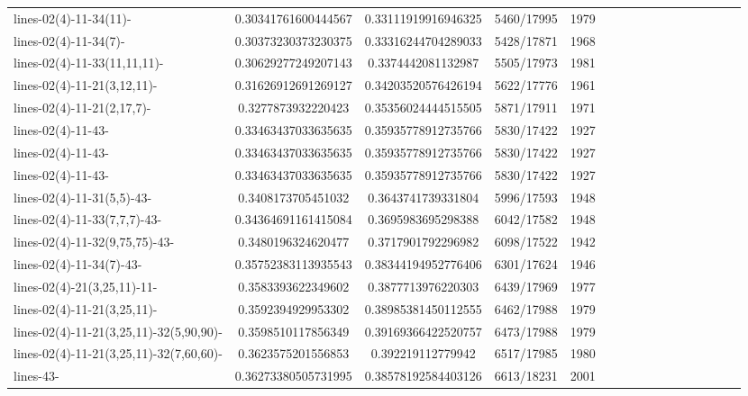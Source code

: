 \documentclass[12pt,oneside]{report}			%
\begin{document}
\begin{landscape}
\begin{longtable}{ | p{5cm} | *{15}{c|}}
lines-02(4)-11-34(11)-                            & 0.30341761600444567 & 0.33111919916946325 & 5460/17995  & 1979 \\
lines-02(4)-11-34(7)-                             & 0.30373230373230375 & 0.33316244704289033 & 5428/17871  & 1968 \\
lines-02(4)-11-33(11,11,11)-                       & 0.30629277249207143 & 0.3374442081132987  & 5505/17973  & 1981 \\
lines-02(4)-11-21(3,12,11)-                       & 0.31626912691269127 & 0.34203520576426194 & 5622/17776  & 1961 \\
lines-02(4)-11-21(2,17,7)-                        & 0.3277873932220423  & 0.35356024444515505 & 5871/17911  & 1971 \\
lines-02(4)-11-43-                                & 0.33463437033635635 & 0.35935778912735766 & 5830/17422  & 1927 \\
lines-02(4)-11-43-                                & 0.33463437033635635 & 0.35935778912735766 & 5830/17422  & 1927 \\
lines-02(4)-11-43-                                & 0.33463437033635635 & 0.35935778912735766 & 5830/17422  & 1927 \\
lines-02(4)-11-31(5,5)-43-                        & 0.3408173705451032  & 0.3643741739331804  & 5996/17593  & 1948 \\
lines-02(4)-11-33(7,7,7)-43-                     & 0.34364691161415084 & 0.3695983695298388  & 6042/17582  & 1948 \\
lines-02(4)-11-32(9,75,75)-43-                    & 0.3480196324620477  & 0.3717901792296982  & 6098/17522  & 1942 \\
lines-02(4)-11-34(7)-43-                          & 0.35752383113935543 & 0.38344194952776406 & 6301/17624  & 1946 \\
lines-02(4)-21(3,25,11)-11-                       & 0.3583393622349602  & 0.3877713976220303  & 6439/17969  & 1977 \\
lines-02(4)-11-21(3,25,11)-                       & 0.3592394929953302  & 0.38985381450112555 & 6462/17988  & 1979 \\
lines-02(4)-11-21(3,25,11)-32(5,90,90)-           & 0.3598510117856349  & 0.39169366422520757 & 6473/17988  & 1979 \\
lines-02(4)-11-21(3,25,11)-32(7,60,60)-           & 0.3623575201556853  & 0.392219112779942   & 6517/17985  & 1980 \\
lines-43-                                         & 0.36273380505731995 & 0.38578192584403126 & 6613/18231  & 2001 \\

\end{longtable}
\end{landscape}
\end{document}

